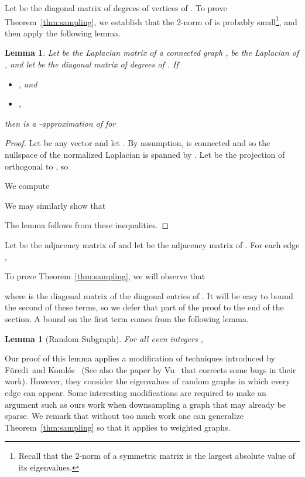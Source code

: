 \documentclass[11pt]{article}
\newtheorem{lemma}[theorem]{Lemma}
\newcommand{\Furedi}{F{\"u}redi}
\newcommand{\Komlos}{Koml{\'o}s}
\begin{document}
Let  be the diagonal matrix of degrees of vertices of .
To prove Theorem~\ref{thm:sampling}, we  establish that
  the 2-norm of  is probably small\footnote{Recall that the 2-norm of a symmetric matrix is the largest absolute value of
its eigenvalues.}, and then apply the following lemma.

\begin{lemma}\label{lem:normSmallApprox}
Let  be the Laplacian matrix of a connected graph ,  be the Laplacian of ,
  and let  be the diagonal matrix of degrees of .
If
\begin{itemize}
\item [1.] , and
\item [2.] ,
\end{itemize}
then  is a -approximation of  for

\end{lemma}
\begin{proof}
Let  be any vector and let .
By assumption,  is connected and so
  the nullspace of the normalized Laplacian 
  is spanned by .
Let  be the projection of  orthogonal to
  , so

We compute

We may similarly show that

The lemma follows from these inequalities.
\end{proof}

Let  be the adjacency matrix of  and let  be the adjacency matrix
  of .
For each edge ,


To prove Theorem~\ref{thm:sampling}, we will observe that

where  is the diagonal matrix of the diagonal entries of .
It will be easy to bound the second of these terms, so we defer that part of the proof
  to the end of the section.
A bound on the first term comes from the following lemma.

\begin{lemma}[Random Subgraph]\label{lem:sampling}
For all even integers ,

\end{lemma}

Our proof of this lemma applies a modification of techniques introduced
  by \Furedi \ and \Komlos~\cite{FurediKomlos} (See also the paper by
  Vu~\cite{Vu} that corrects some bugs in their work).
However, they consider the eigenvalues of random graphs in which
  every edge can appear.
Some interesting modifications are required to make an argument such
  as ours work when downsampling a graph that may already be sparse.
We remark that without too much work one can
  generalize Theorem~\ref{thm:sampling} so that it applies
  to weighted graphs.
\end{document}
